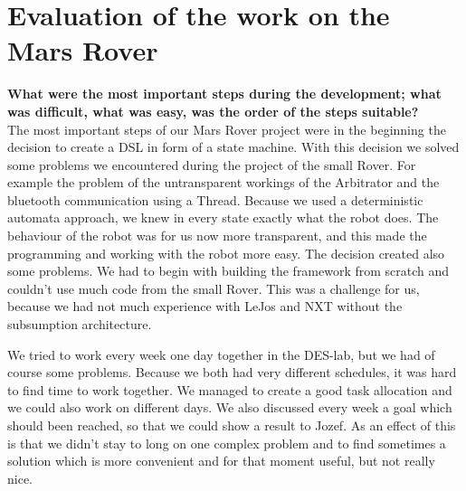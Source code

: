 \documentclass[11pt,a4paper]{article}
\begin{document}

\section{Evaluation of the work on the Mars Rover}
\textbf{What were the most important steps during the development; what was difficult, what was easy, was the order of the steps suitable?}\\
The most important steps of our Mars Rover project were in the beginning the decision to create a DSL in form of a state machine. With this decision we solved some problems we encountered during the project of the small Rover. For example the problem of the untransparent workings of the Arbitrator and the bluetooth communication using a Thread. Because we used a deterministic automata approach, we knew in every state exactly what the robot does. The behaviour of the robot was for us now more transparent, and this made the programming and working with the robot more easy. 
The decision created also some problems. We had to begin with building the framework from scratch and couldn't use much code from the small Rover. This was a challenge for us, because we had not much experience with LeJos and NXT without the subsumption architecture.

We tried to work every week one day together in the DES-lab, but we had of course some problems. Because we both had very different schedules, it was hard to find time to work together. We managed to create a good task allocation and we could also work on different days. We also discussed every week a goal which should been reached, so that we could show a result to Jozef. As an effect of this is that we didn't stay to long on one complex problem and to find sometimes a solution which is more convenient and for that moment useful, but not really nice. %
\end{document}
